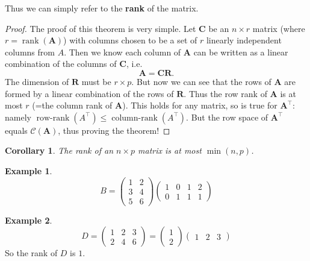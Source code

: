 \documentclass[]{book}
\newtheorem{corollary}{Corollary}[chapter]
\theoremstyle{definition}
\theoremstyle{definition}
\newtheorem{example}{Example}[chapter]
\theoremstyle{definition}
\theoremstyle{remark}
\begin{document}
Thus we can simply refer to the \textbf{rank} of the matrix.

\begin{proof}
{}The proof of this theorem is very simple. Let \(\mathbf C\) be an \(n \times r\) matrix (where \(r=\operatorname{rank}(\mathbf A)\)) with columns chosen to be a set of \(r\) linearly independent columns from \(A\). Then we know each column of \(\mathbf A\) can be written as a linear combination of the columns of \(\mathbf C\), i.e.
\[\mathbf A= \mathbf C\mathbf R.\]
The dimension of \(\mathbf R\) must be \(r \times p\). But now we can see that the rows of \(\mathbf A\) are formed by a linear combination of the rows of \(\mathbf R\). Thus the row rank of \(\mathbf A\) is at most \(r\) (=the column rank of \(\mathbf A\)). This holds for any matrix, so is true for \(\mathbf A^\top\): namely \(\operatorname{row-rank}(A^\top)\leq \operatorname{column-rank}(A^\top)\). But the row space of \(\mathbf A^\top\) equals \(\mathcal{C}(\mathbf A)\), thus proving the theorem!
\end{proof}

\begin{corollary}
\protect\hypertarget{cor:unnamed-chunk-2}{}{\label{cor:unnamed-chunk-2} }The rank of an \(n\times p\) matrix is at most \(\min(n,p)\).
\end{corollary}

\begin{example}
\protect\hypertarget{exm:matrix1}{}{\label{exm:matrix1} }\[B = \left( \begin{array}{cccc} 1 & 2\\ 3&4 \\5&6\end{array}\right)\left(\begin{array}{cccc}1&0&1&2\\0&1&1&1\end{array}\right)
\]
\end{example}

\begin{example}
\protect\hypertarget{exm:matrix2}{}{\label{exm:matrix2} }\[ D=\left( \begin{array}{ccc} 1 & 2&3\\ 2&4&6 \end{array}\right)= \left( \begin{array}{c} 1 \\ 2 \end{array}\right)\left(\begin{array}{ccc}1&2&3\end{array}\right)
\]
So the rank of \(D\) is \(1\).
\end{example}
\end{document}
